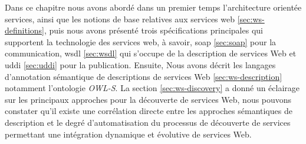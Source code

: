 Dans ce chapitre nous avons abordé dans un premier temps
l'architecture orientée services, ainsi que les notions de base
relatives aux services web \ref{sec:ws-definitions}, puis nous avons
présenté trois spécifications principales qui supportent la
technologie des services web, à savoir, \acrshort{soap} \ref{sec:soap}
pour la communication, \acrshort{wsdl} \ref{sec:wsdl} qui s'occupe de
la description de services Web et \acrshort{uddi} \ref{sec:uddi} pour
la publication. Ensuite, Nous avons décrit les langages d'annotation
sémantique de descriptions de services Web \ref{sec:ws-description}
notamment l'ontologie \textit{OWL-S}. La section
\ref{sec:ws-discovery} a donné un éclairage sur les principaux
approches pour la découverte de services Web, nous pouvons constater
qu'il existe une corrélation directe entre les approches sémantiques
de description et le degré d'automatisation du processus de découverte
de services permettant une intégration dynamique et évolutive de
services Web.

